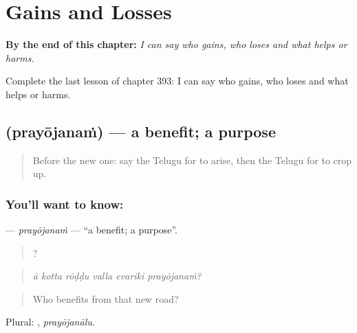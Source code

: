 
\chapter{Gains and Losses}
\label{ch:te-gains-and-losses}

\begin{chapteropening}
\textbf{By the end of this chapter:} \emph{I can say who gains, who loses and what helps or harms.}

Complete the last lesson of chapter 393: I can say who gains, who loses and what helps or harms.
\end{chapteropening}

\section[\texorpdfstring{\te{ప్రయోజనం} (prayōjanaṁ)}{ప్రయోజనం (prayōjanaṁ)}]{ (prayōjanaṁ) — a benefit; a purpose}

\label{lesson:TE-C393-prayojanam}



\begin{quote}
Before the new one: say the Telugu for to arise, then the Telugu for to crop up.
\end{quote}

\subsection*{You'll want to know: }
\textbf{} — \emph{prayōjanaṁ} — \textquotedblleft{}a benefit; a purpose\textquotedblright{}.

\begin{quote}
     ?
\end{quote}

\begin{quote}
\emph{ā kotta rōḍḍu valla evariki prayōjanaṁ?}
\end{quote}

\begin{quote}
Who benefits from that new road?
\end{quote}

Plural: , \emph{prayōjanālu}.

